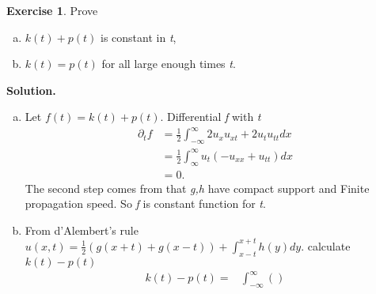 \message{ !name(PDE-hw5-21935004-\unexpanded{谭焱}.tex)}\documentclass[a4paper]{book}
\newenvironment{solution}%
{\noindent\textbf{Solution.}}%
{\qedhere}
\numberwithin{equation}{chapter}
\theoremstyle{definition}
\newtheorem{exc}[exm]{Exercise}
\begin{document}
\begin{multicols}{2}
\begin{exc}
  Prove
  \begin{enumerate} [(a)]
  \item $k(t) + p(t)$ is constant in \textit{t},
  \item $k(t) = p(t)$ for all large enough times \textit{t}.
  \end{enumerate}
\end{exc}

\begin{solution}
  \begin{enumerate} [(a)]
  \item Let $f(t) = k(t) + p(t)$. Differential \textit{f} with \textit{t}
    \begin{align*}
      \partial_t f &= \frac{1}{2}{\int^{\infty}_{-\infty} 2u_x u_{xt} + 2u_t u_{tt} dx} \\
                   &= \frac{1}{2} \int^{\infty}_{\infty} u_t(- u_{xx} + u_{tt})dx \\
                   &= 0.
    \end{align*}
    The second step comes from that \textit{g,h} have compact support and Finite propagation speed. So \textit{f} is constant function for \textit{t}.

  \item From d'Alembert's rule $u(x,t) = \frac{1}{2}(g(x+t) + g(x-t)) + \int_{x-t}^{x+t} h(y)dy$.
    calculate $k(t) - p(t)$
    \begin{align*}
      k(t) - p(t) =& \int_{-\infty}^{\infty} ()
    \end{align*}
  \end{enumerate}
\end{solution}




\end{multicols}
\end{document}
